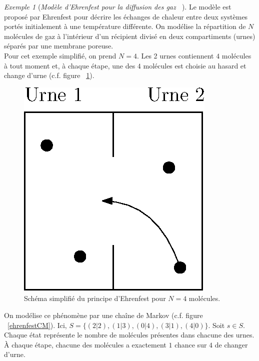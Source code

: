 \documentclass[12pt,a4paper]{report}
\theoremstyle{definition}%
\theoremstyle{remark}
\newtheorem{example}{Exemple}[chapter]
\newcommand{\cf}{c.f. }
\begin{document}
\begin{example}[\textit{Modèle d'Ehrenfest pour la diffusion des gaz ~\cite{Course3}}]
	Le modèle est proposé par Ehrenfest pour décrire les échanges de chaleur entre deux systèmes portés initialement à une température différente. On modélise la répartition de $N$ molécules de gaz à l'intérieur d'un récipient divisé en deux compartiments (urnes) séparés par une membrane poreuse.\\
	Pour cet exemple simplifié, on prend $N = 4$. Les 2 urnes contiennent $4$ molécules à tout moment et, à chaque étape, une des $4$ molécules est choisie au hasard et change d'urne (\cf figure ~\ref{ehrenfestscheme}).
	\begin{figure}[H]
		\centering
		\includegraphics[scale=0.5]{figures/EhrenfestUrne.eps}
		\caption{Schéma simplifié du principe d'Ehrenfest pour $N=4$ molécules.}
		\label{ehrenfestscheme}
	\end{figure}

	On modélise ce phénomène par une chaîne de Markov (\cf figure ~\ref{ehrenfestCM}). Ici, $S=\{(2|2), (1|3), (0|4), (3|1), (4|0) \}$. Soit $s \in S$. Chaque état représente le nombre de molécules présentes dans chacune des urnes. \`A chaque étape, chacune des molécules a exactement $1$ chance sur $4$ de changer d'urne.


\end{example}
\end{document}

